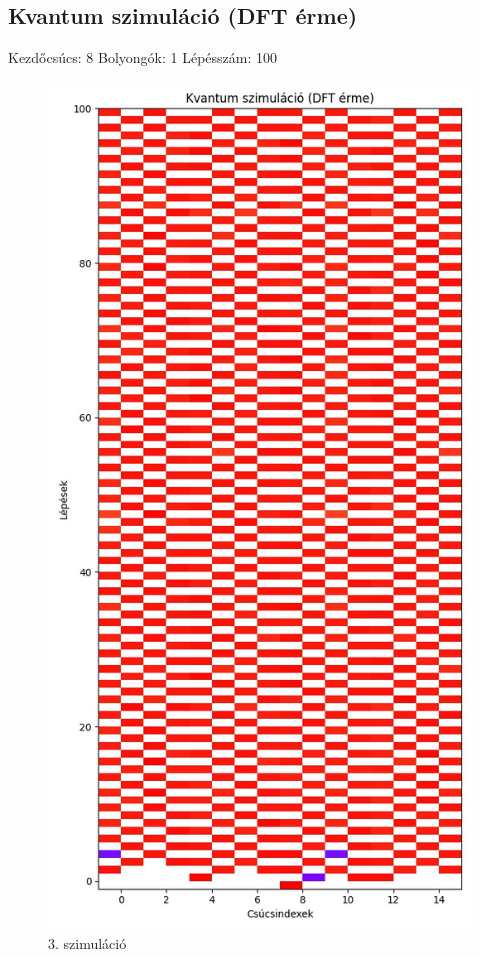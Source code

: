 \documentclass[14pt,a4paper]{article}
\begin{document}
\subsection{Kvantum szimuláció (DFT érme)}
Kezdőcsúcs: 8
Bolyongók: 1
Lépésszám: 100
\begin{figure}[H]
\centering
\includegraphics[width = 0.7\columnwidth]{sim_03/counts.jpg}
\caption{3. szimuláció}
\end{figure}
\end{document}
